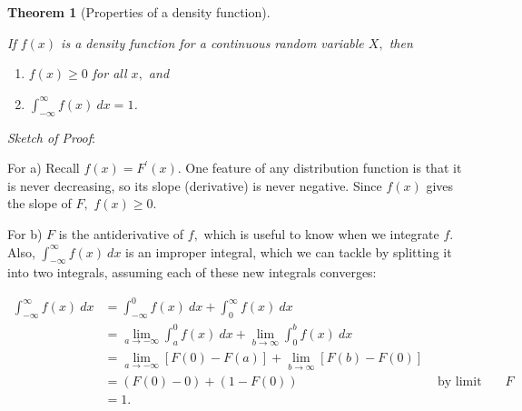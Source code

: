\documentclass[
]{book}
\providecommand{\tightlist}{%
  \setlength{\itemsep}{0pt}\setlength{\parskip}{0pt}}
\newtheorem{theorem}{Theorem}[chapter]
\theoremstyle{definition}
\theoremstyle{definition}
\theoremstyle{definition}
\theoremstyle{definition}
\theoremstyle{remark}
\begin{document}
\begin{theorem}[Properties of a density function]
\protect\hypertarget{thm:pdf-props}{}\label{thm:pdf-props}

If \(f(x)\) is a density function for a continuous random variable \(X,\) then

\begin{enumerate}
\def\labelenumi{\alph{enumi})}
\tightlist
\item
  \(f(x) \geq 0\) for all \(x,\) and
\item
  \(\displaystyle \int_{-\infty}^{\infty} f(x)~dx = 1\).
\end{enumerate}

\end{theorem}

\emph{Sketch of Proof}:

For a) Recall \(f(x) = F^\prime(x)\). One feature of any distribution function is that it is never decreasing, so its slope (derivative) is never negative. Since \(f(x)\) gives the slope of \(F,\) \(f(x) \geq 0\).

For b) \(F\) is the antiderivative of \(f,\) which is useful to know when we integrate \(f\). Also, \(\displaystyle \int_{-\infty}^{\infty} f(x)~dx\) is an improper integral, which we can tackle by splitting it into two integrals, assuming each of these new integrals converges:

\begin{align*}
\int_{-\infty}^{\infty} f(x)~dx &= \int_{-\infty}^{0} f(x)~dx + \int_{0}^{\infty} f(x)~dx  \\
&= \lim_{a \to -\infty} \int_a^0 f(x)~dx + \lim_{b \to \infty} \int_0^b f(x)~dx \\
&=  \lim_{a \to -\infty} \left[F(0)-F(a)\right] + \lim_{b \to \infty} \left[F(b)-F(0)\right] \\
&= (F(0)-0) + (1 - F(0))  & \text{ by limit properties of } F \\
&= 1.
\end{align*}
\end{document}
